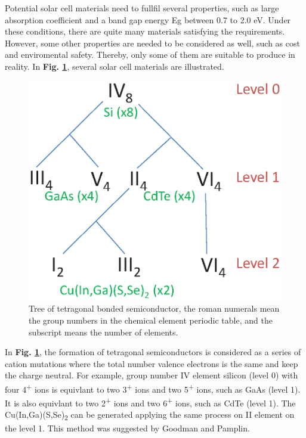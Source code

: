\documentclass[a4paper, 12pt, titlepage,oneside,drop]{kthesis}
\begin{document}
Potential solar cell materials need to fullfil several properties, such as large absorption coefficient and a band gap energy Eg between 0.7 to 2.0 eV. Under these conditions, there are quite many materials satisfying the 
requirements. However, some other properties are needed to be considered as well, such as cost and enviromental safety. Thereby, only some of them are suitable to produce in reality. In \textbf{Fig. \ref{lscm}}, several solar cell
materials are illustrated. 

\begin{figure}[H]
\centering
\includegraphics[scale=0.5]{tree.eps} 
\caption{Tree of tetragonal bonded semiconductor, the roman numerals mean the group numbers in the chemical element periodic table, and the subscript means the number of elements.}
\label{lscm}
\end{figure}

In \textbf{Fig. \ref{lscm}}, the formation of tetragonal semiconductors is considered as a series of cation mutations where the total number valence electrons is the same and keep the charge neutral. For example, group number
IV element silicon (level 0) with four 4\textsuperscript{+} ions is equivlant to two 3\textsuperscript{+} ions and two 5\textsuperscript{+} ions, such as GaAs (level 1). It is also equivlant to two 2\textsuperscript{+} ions
and two 6\textsuperscript{+} ions, such as CdTe (level 1). The Cu(In,Ga)(S,Se)\textsubscript{2} can be generated applying the same process on II element on the level 1. This method was suggested by Goodman and Pamplin. 
\end{document}

